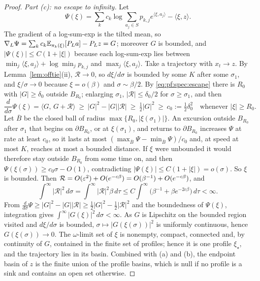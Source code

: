 \documentclass{article} %
\theoremstyle{plain}
\theoremstyle{definition}
\theoremstyle{remark}
\begin{document}
\begin{proof}
\emph{Part (c): no escape to infinity.} Let
\[
\Psi(\xi)=\sum_kc_k\log\sum_{a_j\in S}p_{k,j}e^{\langle\xi,a_j\rangle}-\langle\xi,z\rangle .
\]
The gradient of a log-sum-exp is the tilted mean, so $\nabla_L\Psi=\sum_kc_k\mathbb{E}_{\pi_k(\xi)}[P_La]
-P_Lz=G$; moreover $G$ is bounded, and $|\Psi(\xi)|\le C(1+|\xi|)$ because each log-sum-exp lies
between $\min_j\langle\xi,a_j\rangle+\log\min_jp_{k,j}$ and $\max_j\langle\xi,a_j\rangle$. Take a
trajectory with $x_t\to z$. By Lemma~\ref{lem:offtie}(ii), $\mathcal R\to0$, so $d\xi/d\sigma$ is
bounded by some $K$ after some $\sigma_1$, and $\xi/\sigma\to0$ because $\xi=o(\beta)$ and
$\sigma\sim\beta/2$. By \eqref{eq:pf:spec:escape} there is $R_0$ with $|G|\ge\delta_0$ outside
$B_{R_0}$; enlarging $\sigma_1$, $|\mathcal R|\le\delta_0/2$ for $\sigma\ge\sigma_1$, and then
\[
\frac{d}{d\sigma}\Psi(\xi)=\langle G,\,G+\mathcal R\rangle\ \ge\ |G|^2-|G||\mathcal R|
\ \ge\ \tfrac12|G|^2\ \ge\ c_0:=\tfrac12\delta_0^2
\quad\text{whenever }|\xi|\ge R_0 .
\]
Let $\overline B$ be the closed ball of radius $\max\{R_0,|\xi(\sigma_1)|\}$. An excursion outside
$B_{R_0}$ after $\sigma_1$ that begins on $\partial B_{R_0}$, or at $\xi(\sigma_1)$, and returns to
$\partial B_{R_0}$ increases $\Psi$ at rate at least $c_0$, so it lasts at most
$(\max_{\overline B}\Psi-\min_{\overline B}\Psi)/c_0$ and, at speed at most $K$, reaches at most a
bounded distance. If $\xi$ were unbounded it would therefore stay outside $B_{R_0}$ from some time
on, and then $\Psi(\xi(\sigma))\ge c_0\sigma-O(1)$, contradicting
$|\Psi(\xi)|\le C(1+|\xi|)=o(\sigma)$. So $\xi$ is bounded. Then $\mathcal R=O(\varepsilon^2)+O(e^{-c\beta})
=O(\beta^{-1})+O(e^{-c\beta})$, and
\[
\int^\infty|\mathcal R|^2\,d\sigma=\int^\infty|\mathcal R|^2\beta\,d\tau
\le C\int^\infty\bigl(\beta^{-1}+\beta e^{-2c\beta}\bigr)\,d\tau<\infty .
\]
From $\frac{d}{d\sigma}\Psi\ge|G|^2-|G||\mathcal R|\ge\frac12|G|^2-\frac12|\mathcal R|^2$ and the
boundedness of $\Psi(\xi)$, integration gives $\int^\infty|G(\xi)|^2\,d\sigma<\infty$. As $G$ is
Lipschitz on the bounded region visited and $d\xi/d\sigma$ is bounded, $\sigma\mapsto|G(\xi(\sigma))|^2$
is uniformly continuous, hence $G(\xi(\sigma))\to0$. The $\omega$-limit set of $\xi$ is nonempty,
compact, connected and, by continuity of $G$, contained in the finite set of profiles; hence it
is one profile $\xi_\star$, and the trajectory lies in its basin. Combined with (a) and (b), the
endpoint basin of $z$ is the finite union of the profile basins, which is null if no profile is a
sink and contains an open set otherwise.
\end{proof}
\end{document}
